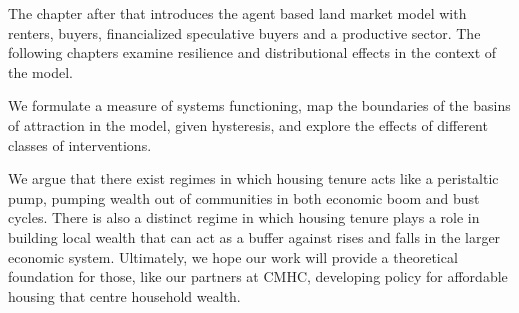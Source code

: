 
The chapter after that introduces the agent based land market model with renters, buyers, financialized speculative buyers and a productive sector. 
The following chapters examine resilience and distributional effects in the context of the model. 


We formulate a measure of systems functioning, map the boundaries of the basins of attraction in the model, given hysteresis, and explore the effects of different classes of interventions. %

We argue that there exist regimes in which housing tenure acts like a peristaltic pump, pumping wealth out of communities in both economic boom and bust cycles. There is also a distinct regime in which housing tenure plays a role in building local wealth that can act as a buffer against rises and falls in the larger economic system. Ultimately, we hope our work will provide a theoretical foundation for those, like our partners at CMHC, developing policy for affordable housing that centre household wealth. 

